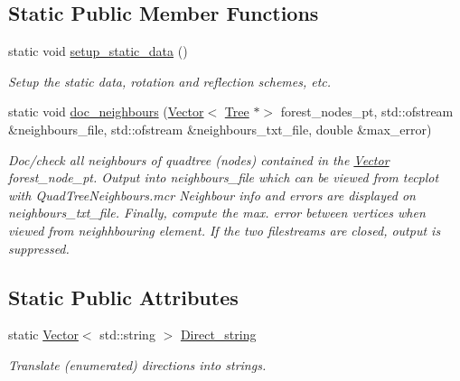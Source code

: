 \subsection*{Static Public Member Functions}
\begin{DoxyCompactItemize}
\item 
static void \hyperlink{classoomph_1_1QuadTree_a5b5c9d4ab6addac9252cb1dadd5b6903}{setup\+\_\+static\+\_\+data} ()
\begin{DoxyCompactList}\small\item\em Setup the static data, rotation and reflection schemes, etc. \end{DoxyCompactList}\item 
static void \hyperlink{classoomph_1_1QuadTree_a5ac5d2986010c9ab152622adb9f6129b}{doc\+\_\+neighbours} (\hyperlink{classoomph_1_1Vector}{Vector}$<$ \hyperlink{classoomph_1_1Tree}{Tree} $\ast$$>$ forest\+\_\+nodes\+\_\+pt, std\+::ofstream \&neighbours\+\_\+file, std\+::ofstream \&neighbours\+\_\+txt\+\_\+file, double \&max\+\_\+error)
\begin{DoxyCompactList}\small\item\em Doc/check all neighbours of quadtree (nodes) contained in the \hyperlink{classoomph_1_1Vector}{Vector} forest\+\_\+node\+\_\+pt. Output into neighbours\+\_\+file which can be viewed from tecplot with Quad\+Tree\+Neighbours.\+mcr Neighbour info and errors are displayed on neighbours\+\_\+txt\+\_\+file. Finally, compute the max. error between vertices when viewed from neighhbouring element. If the two filestreams are closed, output is suppressed. \end{DoxyCompactList}\end{DoxyCompactItemize}
\subsection*{Static Public Attributes}
\begin{DoxyCompactItemize}
\item 
static \hyperlink{classoomph_1_1Vector}{Vector}$<$ std\+::string $>$ \hyperlink{classoomph_1_1QuadTree_a1b8f4dd684238115e0c4de4860187e4a}{Direct\+\_\+string}
\begin{DoxyCompactList}\small\item\em Translate (enumerated) directions into strings. \end{DoxyCompactList}\end{DoxyCompactItemize}
